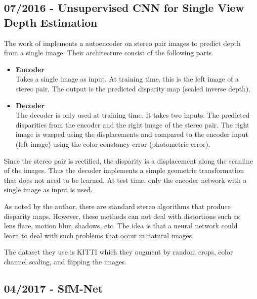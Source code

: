 		\cite{choy20163d}
		
	\subsection{07/2016 - Unsupervised CNN for Single View Depth Estimation}
		
		The work of \cite{garg2016} implements a autoencoder on stereo pair images to predict depth from a single image.
		Their architecture consist of the following parts.
		\begin{itemize}
			\item \textbf{Encoder}
				\\
				Takes a single image as input. 
				At training time, this is the left image of a stereo pair.
				The output is the predicted disparity map (scaled inverse depth).
			\item \textbf{Decoder}
				\\
				The decoder is only used at training time.
				It takes two inputs: The predicted disparities from the encoder and the right image of the stereo pair.
				The right image is warped using the displacements and compared to the encoder input (left image) using the color constancy error (photometric error).
		\end{itemize}
		Since the stereo pair is rectified, the disparity is a displacement along the scanline of the images.
		Thus the decoder implements a simple geometric transformation that does not need to be learned.
		At test time, only the encoder network with a single image as input is used.
		
		As noted by the author, there are standard stereo algorithms that produce disparity maps.
		However, these methods can not deal with distortions such as lens flare, motion blur, shadows, etc.
		The idea is that a neural network could learn to deal with such problems that occur in natural images.
		
		The dataset they use is {KITTI} \cite{Geiger2012KITTI} which they augment by random crops, color channel scaling, and flipping the images.
		
	
	\subsection{04/2017 - SfM-Net}
		
